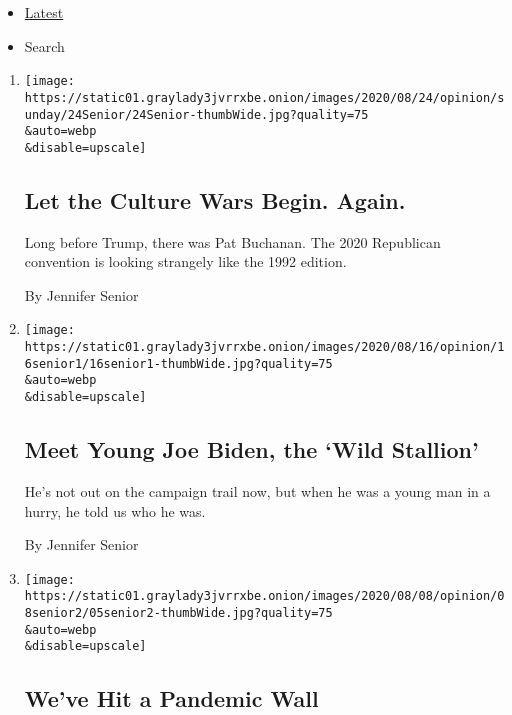 \begin{itemize}
\tightlist
\item
  \protect\hyperlink{stream-panel}{Latest}
\item
  Search
\end{itemize}

\begin{enumerate}
\def\labelenumi{\arabic{enumi}.}
\item
  \href{/2020/08/24/opinion/republican-convention-trump-pat-buchanan.html}{}

  \texttt{[image: https://static01.graylady3jvrrxbe.onion/images/2020/08/24/opinion/sunday/24Senior/24Senior-thumbWide.jpg?quality=75\\\&auto=webp\\\&disable=upscale]}

  \hypertarget{let-the-culture-wars-begin-again}{%
  \subsection{Let the Culture Wars Begin.
  Again.}\label{let-the-culture-wars-begin-again}}

  Long before Trump, there was Pat Buchanan. The 2020 Republican
  convention is looking strangely like the 1992 edition.

  By Jennifer Senior
\item
  \href{/2020/08/15/opinion/joe-biden-2020-1988-what-it-takes.html}{}

  \texttt{[image: https://static01.graylady3jvrrxbe.onion/images/2020/08/16/opinion/16senior1/16senior1-thumbWide.jpg?quality=75\\\&auto=webp\\\&disable=upscale]}

  \hypertarget{meet-young-joe-biden-the-wild-stallion}{%
  \subsection{Meet Young Joe Biden, the `Wild
  Stallion'}\label{meet-young-joe-biden-the-wild-stallion}}

  He's not out on the campaign trail now, but when he was a young man in
  a hurry, he told us who he was.

  By Jennifer Senior
\item
  \href{/2020/08/05/opinion/coronavirus-mental-illness-depression.html}{}

  \texttt{[image: https://static01.graylady3jvrrxbe.onion/images/2020/08/08/opinion/08senior2/05senior2-thumbWide.jpg?quality=75\\\&auto=webp\\\&disable=upscale]}

  \hypertarget{weve-hit-a-pandemic-wall}{%
  \subsection{We've Hit a Pandemic
  Wall}\label{weve-hit-a-pandemic-wall}}


\end{enumerate}
